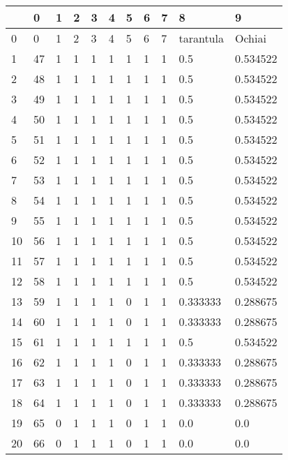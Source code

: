 \begin{tabular}{lllllllllll}
\toprule
{} &       0 &  1 &  2 &  3 &  4 &  5 &  6 &  7 &          8 &         9 \\
\midrule
0  &       0 &  1 &  2 &  3 &  4 &  5 &  6 &  7 &  tarantula &    Ochiai \\
1  &      47 &  1 &  1 &  1 &  1 &  1 &  1 &  1 &        0.5 &  0.534522 \\
2  &      48 &  1 &  1 &  1 &  1 &  1 &  1 &  1 &        0.5 &  0.534522 \\
3  &      49 &  1 &  1 &  1 &  1 &  1 &  1 &  1 &        0.5 &  0.534522 \\
4  &      50 &  1 &  1 &  1 &  1 &  1 &  1 &  1 &        0.5 &  0.534522 \\
5  &      51 &  1 &  1 &  1 &  1 &  1 &  1 &  1 &        0.5 &  0.534522 \\
6  &      52 &  1 &  1 &  1 &  1 &  1 &  1 &  1 &        0.5 &  0.534522 \\
7  &      53 &  1 &  1 &  1 &  1 &  1 &  1 &  1 &        0.5 &  0.534522 \\
8  &      54 &  1 &  1 &  1 &  1 &  1 &  1 &  1 &        0.5 &  0.534522 \\
9  &      55 &  1 &  1 &  1 &  1 &  1 &  1 &  1 &        0.5 &  0.534522 \\
10 &      56 &  1 &  1 &  1 &  1 &  1 &  1 &  1 &        0.5 &  0.534522 \\
11 &      57 &  1 &  1 &  1 &  1 &  1 &  1 &  1 &        0.5 &  0.534522 \\
12 &      58 &  1 &  1 &  1 &  1 &  1 &  1 &  1 &        0.5 &  0.534522 \\
13 &      59 &  1 &  1 &  1 &  1 &  0 &  1 &  1 &   0.333333 &  0.288675 \\
14 &      60 &  1 &  1 &  1 &  1 &  0 &  1 &  1 &   0.333333 &  0.288675 \\
15 &      61 &  1 &  1 &  1 &  1 &  1 &  1 &  1 &        0.5 &  0.534522 \\
16 &      62 &  1 &  1 &  1 &  1 &  0 &  1 &  1 &   0.333333 &  0.288675 \\
17 &      63 &  1 &  1 &  1 &  1 &  0 &  1 &  1 &   0.333333 &  0.288675 \\
18 &      64 &  1 &  1 &  1 &  1 &  0 &  1 &  1 &   0.333333 &  0.288675 \\
19 &      65 &  0 &  1 &  1 &  1 &  0 &  1 &  1 &        0.0 &       0.0 \\
20 &      66 &  0 &  1 &  1 &  1 &  0 &  1 &  1 &        0.0 &       0.0 \\

\end{tabular}

